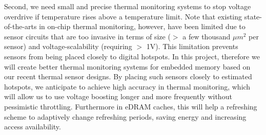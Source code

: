 Second, we need small and precise thermal monitoring systems to stop voltage overdrive if temperature rises above a temperature limit. 
Note that existing state-of-the-arts in on-chip thermal monitoring, however, have been limited due to sensor circuits that are too invasive in terms of size ($>$ a few thousand $\mu m^2$ per sensor) and voltage-scalability (requiring $>$ 1V). 
This limitation prevents sensors from being placed closely to digital hotspots. 
In this project, therefore we will create better thermal monitoring systems for embedded memory based on our recent thermal sensor designs. 
By placing such sensors closely to estimated hotspots, we anticipate to achieve high accuracy in thermal monitoring, which will allow us to use voltage boosting longer and more frequently without pessimistic throttling. 
Furthermore in eDRAM caches, this will help a refreshing scheme to adaptively change refreshing periods, saving energy and increasing access availability. 



